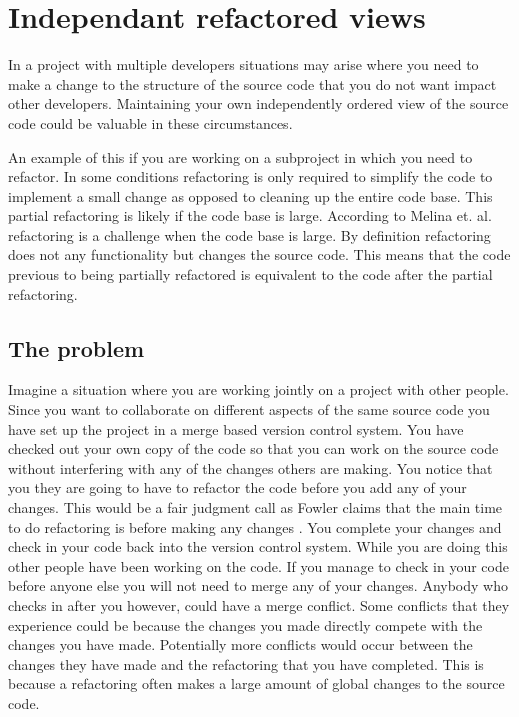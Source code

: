 
\chapter{Independant refactored views}

In a project with multiple developers situations may arise where you need to make a change to the structure of the source code that you do not want impact other developers.  Maintaining your own independently ordered view of the source code could be valuable in these circumstances. 

An example of this if you are working on a subproject in which you need to refactor. In some conditions refactoring is only required to simplify the code to implement a small change as opposed to cleaning up the entire code base.  This partial refactoring is likely if the code base is large. According to Melina et. al. \cite{Milea2014} refactoring is a challenge when the code base is large. By definition refactoring does not any functionality but changes the source code. This means that the code previous to being partially refactored is equivalent to the code after the partial refactoring.

\section{The problem}
Imagine a situation where you are working jointly on a project with other people. Since you want to collaborate on different aspects of the same source code you have set up the project in a merge based version control system.  You have checked out your own copy of the code so that you can work on the source code without interfering with any of the changes others are making. You notice that you they are going to have to refactor the code before you add any of your changes.  This would be a fair judgment call as Fowler claims that the main time to do refactoring is before making any changes \cite{Fowler1999}. You complete your changes and check in your code back into the version control system.  While you are doing this other people have been working on the code.  If you manage to check in your code before anyone else you will not need to merge any of your changes.  Anybody who checks in after you however, could have a merge conflict.  Some conflicts that they experience could be because the changes you made directly compete with the changes you have made. Potentially more conflicts would occur between the changes they have made and the refactoring that you have completed. This is because a refactoring often makes a large amount of global changes to the source code.

